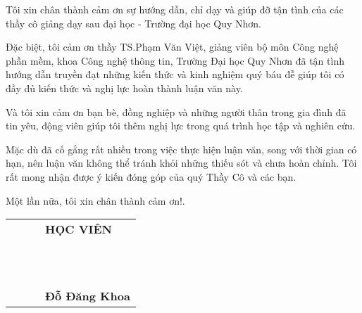 
Tôi xin chân thành cảm ơn sự hướng dẫn, chỉ dạy và giúp đỡ tận tình của các thầy cô giảng dạy sau đại học - Trường đại học Quy Nhơn.

Đặc biệt, tôi cảm ơn thầy TS.Phạm Văn Việt, giảng viên bộ môn Công nghệ phần mềm, khoa Công nghệ thông tin, Trường Đại học Quy Nhơn đã tận tình hướng dẫn truyền đạt những kiến thức và kinh nghiệm quý báu đễ giúp tôi có đầy đủ kiến thức và nghị lực hoàn thành luận văn này.

Và tôi xin cảm ơn bạn bè, đồng nghiệp và những người thân trong gia đình đã tin yêu, động viên giúp tôi thêm nghị lực trong quá trình học tập và nghiên cứu.

Mặc dù đã cố gắng rất nhiều trong việc thực hiện luận văn, song với thời gian có hạn, nên luận văn không thể tránh khỏi những thiếu sót và chưa hoàn chỉnh. Tôi rất mong nhận được ý kiến đóng góp của quý Thầy Cô và các bạn.

Một lần nữa, tôi xin chân thành cảm ơn!.


\begin{tabu} to 1.0 \textwidth {  X[c] X[c]  X[c]  X[c]  }

	 & &  & \textbf{HỌC VIÊN} \\
	 \\ \\ \\ \\ \\ \\ \\ \\ \\ \\ \\ 
	 & &  & \textbf{Đỗ Đăng Khoa}  \\
         
       \end{tabu}


       
